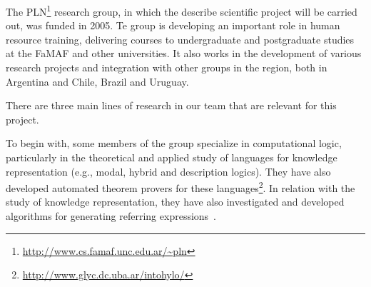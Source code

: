

The PLN\footnote{\url{http://www.cs.famaf.unc.edu.ar/~pln}} research group, 
in which the describe scientific project will be carried out, was funded in 2005.
Te group is developing an important role in human resource training,
delivering courses to undergraduate and postgraduate studies at the FaMAF and
other universities. It also works in the development of various research
projects and integration with other groups in the region, both in Argentina and
Chile, Brazil and Uruguay. 



There are three main lines of research in our team that are relevant for this
project. 

To begin with, some members of the group specialize in computational
logic, particularly in the theoretical and applied study of languages for
knowledge representation (e.g., modal, hybrid and description logics). They
have also developed  automated theorem provers for these
languages\footnote{\url{http://www.glyc.dc.uba.ar/intohylo/}}. In relation with 
the study of knowledge representation, they have also investigated and developed
algorithms for generating referring expressions~\cite{AKS08}.

